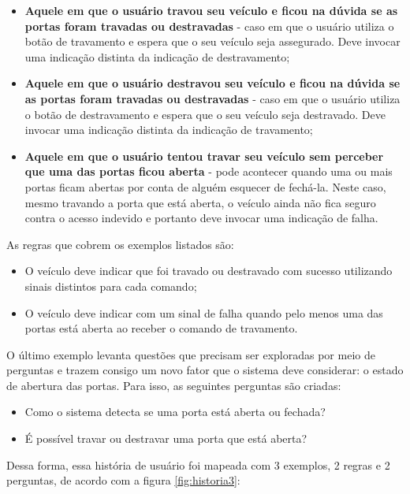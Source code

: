 \begin{itemize}
    \item \textbf{Aquele em que o usuário travou seu veículo e ficou na dúvida se as portas foram travadas ou destravadas} - caso em que o usuário utiliza o botão de travamento e espera que o seu veículo seja assegurado. Deve invocar uma indicação distinta da indicação de destravamento;
    \item \textbf{Aquele em que o usuário destravou seu veículo e ficou na dúvida se as portas foram travadas ou destravadas} - caso em que o usuário utiliza o botão de destravamento e espera que o seu veículo seja destravado. Deve invocar uma indicação distinta da indicação de travamento;
    \item \textbf{Aquele em que o usuário tentou travar seu veículo sem perceber que uma das portas ficou aberta} - pode acontecer quando uma ou mais portas ficam abertas por conta de alguém esquecer de fechá-la. Neste caso, mesmo travando a porta que está aberta, o veículo ainda não fica seguro contra o acesso indevido e portanto deve invocar uma indicação de falha.
\end{itemize} 

As regras que cobrem os exemplos listados são:

\begin{itemize}
    \item O veículo deve indicar que foi travado ou destravado com sucesso utilizando sinais distintos para cada comando;
    \item O veículo deve indicar com um sinal de falha quando pelo menos uma das portas está aberta ao receber o comando de travamento.
\end{itemize}

O último exemplo levanta questões que precisam ser exploradas por meio de perguntas e trazem consigo um novo fator que o sistema deve considerar: o estado de 
abertura das portas. Para isso, as seguintes perguntas são criadas:

\begin{itemize}
    \item Como o sistema detecta se uma porta está aberta ou fechada?
    \item É possível travar ou destravar uma porta que está aberta?
\end{itemize}

Dessa forma, essa história de usuário foi mapeada com 3 exemplos, 2 regras e 2 perguntas, de acordo com a figura \ref{fig:historia3}:

